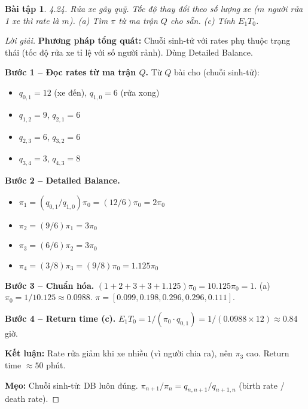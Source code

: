 \documentclass[8pt,a4paper]{article}
\newtheorem{exercise}{Bài tập}
\newenvironment{solution}{\begin{proof}[Lời giải]}{\end{proof}}
\begin{document}
\begin{exercise}
4.24. Rửa xe gây quỹ. Tốc độ thay đổi theo số lượng xe ($m$ người rửa 1 xe thì rate là $m$).
(a) Tìm $\pi$ từ ma trận $Q$ cho sẵn. (c) Tính $E_1 T_0$.
\end{exercise}
\begin{solution}
\textbf{Phương pháp tổng quát:} Chuỗi sinh-tử với rates phụ thuộc trạng thái (tốc độ rửa xe tỉ lệ với số người rảnh). Dùng Detailed Balance.

\textbf{Bước 1 -- Đọc rates từ ma trận $Q$.} Từ $Q$ bài cho (chuỗi sinh-tử):
\begin{itemize}[nosep]
\item $q_{0,1} = 12$ (xe đến), $q_{1,0} = 6$ (rửa xong)
\item $q_{1,2} = 9$, $q_{2,1} = 6$
\item $q_{2,3} = 6$, $q_{3,2} = 6$
\item $q_{3,4} = 3$, $q_{4,3} = 8$
\end{itemize}

\textbf{Bước 2 -- Detailed Balance.}
\begin{itemize}[nosep]
\item $\pi_1 = (q_{0,1}/q_{1,0})\pi_0 = (12/6)\pi_0 = 2\pi_0$
\item $\pi_2 = (9/6)\pi_1 = 3\pi_0$
\item $\pi_3 = (6/6)\pi_2 = 3\pi_0$
\item $\pi_4 = (3/8)\pi_3 = (9/8)\pi_0 = 1.125\pi_0$
\end{itemize}

\textbf{Bước 3 -- Chuẩn hóa.} $(1 + 2 + 3 + 3 + 1.125)\pi_0 = 10.125\pi_0 = 1$.
(a) $\pi_0 = 1/10.125 \approx \boxed{0.0988}$. $\pi = [0.099, 0.198, 0.296, 0.296, 0.111]$.

\textbf{Bước 4 -- Return time (c).} $E_1 T_0 = 1/(\pi_0 \cdot q_{0,1}) = 1/(0.0988 \times 12) \approx \boxed{0.84}$ giờ.

\textbf{Kết luận:} Rate rửa giảm khi xe nhiều (vì người chia ra), nên $\pi_3$ cao. Return time $\approx 50$ phút.

\textbf{Mẹo:} Chuỗi sinh-tử: DB luôn đúng. $\pi_{n+1}/\pi_n = q_{n,n+1}/q_{n+1,n}$ (birth rate / death rate).
\end{solution}
\end{document}
